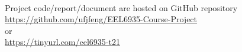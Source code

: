 \documentclass{beamer}
\begin{document}
\begin{frame}
    \\
    \vfill
    Project code/report/document are hosted on GitHub repository\\
    \vspace{1em}
    \url{https://github.com/ufjfeng/EEL6935-Course-Project} \\or\\
    \url{https://tinyurl.com/eel6935-t21}

\end{frame}
\end{document}
